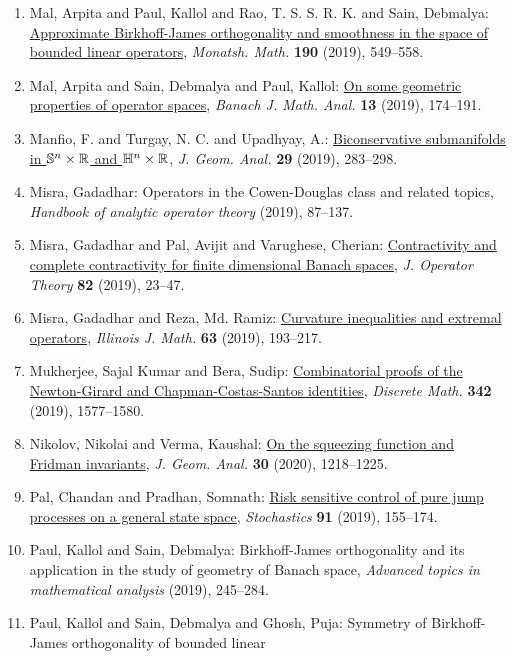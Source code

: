 \begin{enumerate}
\item Mal, Arpita and Paul, Kallol and Rao, T. S. S. R. K. and Sain,
Debmalya: \href{https://doi.org/10.1007/s00605-019-01289-3}{Approximate {B}irkhoff-{J}ames orthogonality and smoothness in
the space of bounded linear operators}, \emph{Monatsh. Math.} {\bf 190} (2019), 549--558.
\item Mal, Arpita and Sain, Debmalya and Paul, Kallol: \href{https://doi.org/10.1215/17358787-2018-0021}{On some geometric properties of operator spaces}, \emph{Banach J. Math. Anal.} {\bf 13} (2019), 174--191.
\item Manfio, F. and Turgay, N. C. and Upadhyay, A.: \href{https://doi.org/10.1007/s12220-018-9990-9}{Biconservative submanifolds in {$\Bbb{S}^n\times\Bbb{R}$} and
{$\Bbb{H}^n\times\Bbb{R}$}}, \emph{J. Geom. Anal.} {\bf 29} (2019), 283--298.
\item Misra, Gadadhar: Operators in the {C}owen-{D}ouglas class and related topics, \emph{Handbook of analytic operator theory} {\bf } (2019), 87--137.
\item Misra, Gadadhar and Pal, Avijit and Varughese, Cherian: \href{https://doi.org/10.7900/jot.2018jun13.2225}{Contractivity and complete contractivity for finite
dimensional {B}anach spaces}, \emph{J. Operator Theory} {\bf 82} (2019), 23--47.
\item Misra, Gadadhar and Reza, Md. Ramiz: \href{https://doi.org/10.1215/00192082-7768711}{Curvature inequalities and extremal operators}, \emph{Illinois J. Math.} {\bf 63} (2019), 193--217.
\item Mukherjee, Sajal Kumar and Bera, Sudip: \href{https://doi.org/10.1016/j.disc.2019.02.013}{Combinatorial proofs of the {N}ewton-{G}irard and
{C}hapman-{C}ostas-{S}antos identities}, \emph{Discrete Math.} {\bf 342} (2019), 1577--1580.
\item Nikolov, Nikolai and Verma, Kaushal: \href{https://doi.org/10.1007/s12220-019-00237-9}{On the squeezing function and {F}ridman invariants}, \emph{J. Geom. Anal.} {\bf 30} (2020), 1218--1225.
\item Pal, Chandan and Pradhan, Somnath: \href{https://doi.org/10.1080/17442508.2018.1521413}{Risk sensitive control of pure jump processes on a general
state space}, \emph{Stochastics} {\bf 91} (2019), 155--174.
\item Paul, Kallol and Sain, Debmalya: Birkhoff-{J}ames orthogonality and its application in the
study of geometry of {B}anach space, \emph{Advanced topics in mathematical analysis} {\bf } (2019), 245--284.
\item Paul, Kallol and Sain, Debmalya and Ghosh, Puja: Symmetry of {B}irkhoff-{J}ames orthogonality of bounded linear

\end{enumerate}
